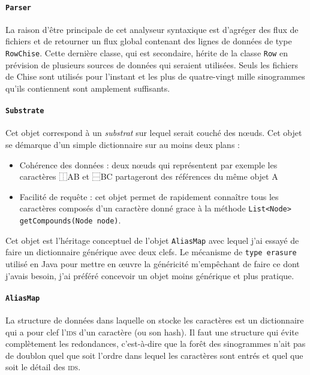 \documentclass[12pt,onecolumn]{article}
\begin{document}
\paragraph{\texttt{Parser}} La raison d'être principale de cet analyseur syntaxique est d'agréger des flux de fichiers et de retourner un flux global contenant des lignes de données de type \texttt{RowChise}. Cette dernière classe, qui est secondaire, hérite de la classe \texttt{Row} en prévision de plusieurs sources de données qui seraient utilisées. Seuls les fichiers de Chise sont utilisés pour l'instant et les plus de quatre-vingt mille sinogrammes qu'ils contiennent sont amplement suffisants.

\paragraph{\texttt{Substrate}} Cet objet correspond à un \textsl{substrat} sur lequel serait couché des nœuds. Cet objet se démarque d'un simple dictionnaire sur au moins deux plans :\begin{itemize}
\item Cohérence des données : deux nœuds qui représentent par exemple les caractères ⿰AB et ⿱BC partageront des références du même objet A
\item Facilité de requête : cet objet permet de rapidement connaître tous les caractères composés d'un caractère donné grace à la méthode \texttt{List<Node> getCompounds(Node node)}.
\end{itemize}

Cet objet est l'héritage conceptuel de l'objet \texttt{AliasMap} avec lequel j'ai essayé de faire un dictionnaire générique avec deux clefs. Le mécanisme de \texttt{type erasure} utilisé en Java pour mettre en œuvre la généricité m'empêchant de faire ce dont j'avais besoin, j'ai préféré concevoir un objet moins générique et plus pratique.

\paragraph{\texttt{AliasMap}}

La structure de données dans laquelle on stocke les caractères est un dictionnaire qui a pour clef l'\textsc{ids} d'un caractère (ou son hash). Il faut une structure qui évite complètement les redondances, c'est-à-dire que la forêt des sinogrammes n'ait pas de doublon quel que soit l'ordre dans lequel les caractères sont entrés et quel que soit le détail des \textsc{ids}.
\end{document}
